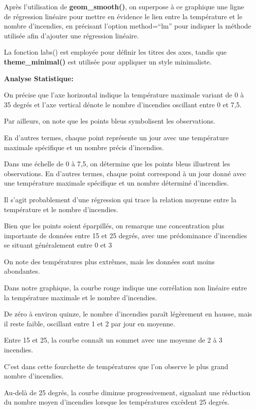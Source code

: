 \documentclass[
]{article}
\begin{document}
Après l'utilisation de \textbf{geom\_smooth()}, on superpose à ce
graphique une ligne de régression linéaire pour mettre en évidence le
lien entre la température et le nombre d'incendies, en précisant
l'option method=``lm'' pour indiquer la méthode utilisée afin d'ajouter
une régression linéaire.

La fonction labs() est employée pour définir les titres des axes, tandis
que \textbf{theme\_minimal()} est utilisée pour appliquer un style
minimaliste.

\textbf{Analyse Statistique:}

On précise que l'axe horizontal indique la température maximale variant
de 0 à 35 degrés et l'axe vertical dénote le nombre d'incendies
oscillant entre 0 et 7,5.

Par ailleurs, on note que les points bleus symbolisent les observations.

En d'autres termes, chaque point représente un jour avec une température
maximale spécifique et un nombre précis d'incendies.

Dans une échelle de 0 à 7,5, on détermine que les points bleus
illustrent les observations. En d'autres termes, chaque point correspond
à un jour donné avec une température maximale spécifique et un nombre
déterminé d'incendies.

Il s'agit probablement d'une régression qui trace la relation moyenne
entre la température et le nombre d'incendies.

Bien que les points soient éparpillés, on remarque une concentration
plus importante de données entre 15 et 25 degrés, avec une prédominance
d'incendies se situant généralement entre 0 et 3

On note des températures plus extrêmes, mais les données sont moins
abondantes.

Dans notre graphique, la courbe rouge indique une corrélation non
linéaire entre la température maximale et le nombre d'incendies.

De zéro à environ quinze, le nombre d'incendies paraît légèrement en
hausse, mais il reste faible, oscillant entre 1 et 2 par jour en
moyenne.

Entre 15 et 25, la courbe connaît un sommet avec une moyenne de 2 à 3
incendies.

C'est dans cette fourchette de températures que l'on observe le plus
grand nombre d'incendies.

Au-delà de 25 degrés, la courbe diminue progressivement, signalant une
réduction du nombre moyen d'incendies lorsque les températures excèdent
25 degrés.
\end{document}
